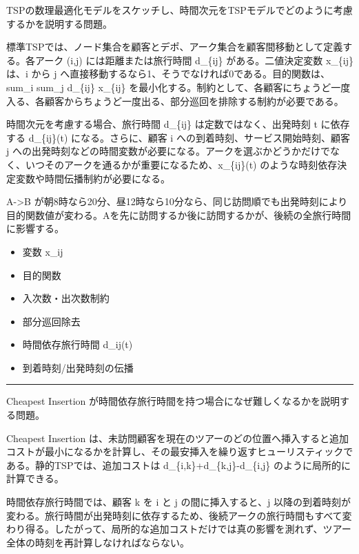 \clearpage
{}
TSPの数理最適化モデルをスケッチし、時間次元をTSPモデルでどのように考慮するかを説明する問題。\par
{}
標準TSPでは、ノード集合を顧客とデポ、アーク集合を顧客間移動として定義する。各アーク (i,j) には距離または旅行時間 d\_\{ij\} がある。二値決定変数 x\_\{ij\} は、i から j へ直接移動するなら1、そうでなければ0である。目的関数は、sum\_i sum\_j d\_\{ij\} x\_\{ij\} を最小化する。制約として、各顧客にちょうど一度入る、各顧客からちょうど一度出る、部分巡回を排除する制約が必要である。\par
時間次元を考慮する場合、旅行時間 d\_\{ij\} は定数ではなく、出発時刻 t に依存する d\_\{ij\}(t) になる。さらに、顧客 i への到着時刻、サービス開始時刻、顧客 j への出発時刻などの時間変数が必要になる。アークを選ぶかどうかだけでなく、いつそのアークを通るかが重要になるため、x\_\{ij\}(t) のような時刻依存決定変数や時間伝播制約が必要になる。\par
{}
A->B が朝8時なら20分、昼12時なら10分なら、同じ訪問順でも出発時刻により目的関数値が変わる。Aを先に訪問するか後に訪問するかが、後続の全旅行時間に影響する。\par
{}
\begin{itemize}
\item 変数 x\_ij
\item 目的関数
\item 入次数・出次数制約
\item 部分巡回除去
\item 時間依存旅行時間 d\_ij(t)
\item 到着時刻/出発時刻の伝播
\end{itemize}
\vspace{2mm}\hrule\vspace{2mm}
Cheapest Insertion が時間依存旅行時間を持つ場合になぜ難しくなるかを説明する問題。\par
{}
Cheapest Insertion は、未訪問顧客を現在のツアーのどの位置へ挿入すると追加コストが最小になるかを計算し、その最安挿入を繰り返すヒューリスティックである。静的TSPでは、追加コストは d\_\{i,k\}+d\_\{k,j\}-d\_\{i,j\} のように局所的に計算できる。\par
時間依存旅行時間では、顧客 k を i と j の間に挿入すると、j 以降の到着時刻が変わる。旅行時間が出発時刻に依存するため、後続アークの旅行時間もすべて変わり得る。したがって、局所的な追加コストだけでは真の影響を測れず、ツアー全体の時刻を再計算しなければならない。\par
